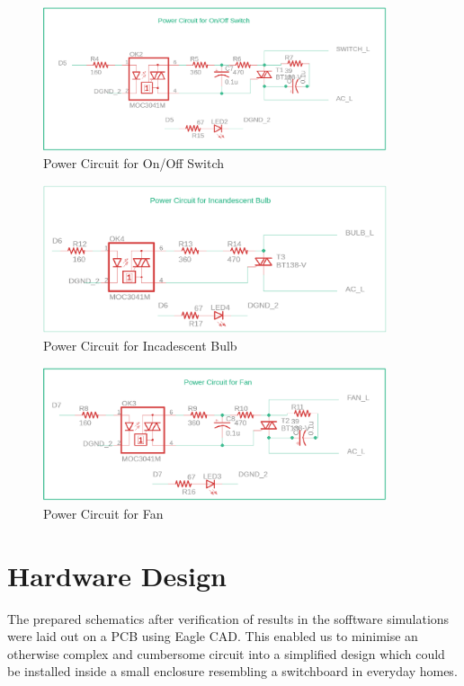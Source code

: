 		    \begin{figure}[H]
		    	\centering
		    	\includegraphics[width=0.9\textwidth]{photos/schematics/switch.png}
		    	\caption{Power Circuit for On/Off Switch}
		    \end{figure}
		    \begin{figure}[H]
		    	\centering
			    \includegraphics[width=0.9\textwidth]{photos/schematics/bulb.png}
			    \caption{Power Circuit for Incadescent Bulb}
		    \end{figure}
			\begin{figure}[H]
				\centering
				\includegraphics[width=0.9\textwidth]{photos/schematics/fan.png}
				\caption{Power Circuit for Fan}
			\end{figure}
		\newpage
		
        \section{Hardware Design}
        
        	The prepared schematics after verification of results in the sofftware simulations were laid out on a PCB using Eagle CAD. This enabled us to minimise an otherwise complex and cumbersome circuit into a simplified design which could be installed inside a small enclosure resembling a switchboard in everyday homes.
        
